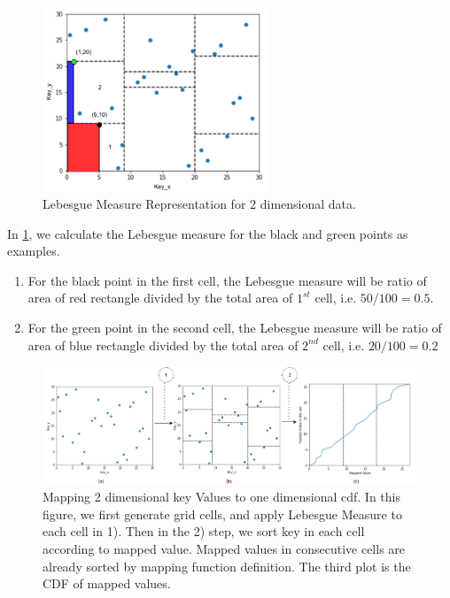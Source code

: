 \begin{figure}[t]
    \centering
    \includegraphics[width=0.6\textwidth]{graphs/implementation/Lebesgue_Measure.pdf}
    \caption{Lebesgue Measure Representation for 2 dimensional data.}
    \label{fig:Lebesgue_Measure}
\end{figure}

\begin{mscexample}
	In \ref{fig:Lebesgue_Measure}, we calculate the Lebesgue measure for the black and green points as examples.
	\begin{enumerate}
		\item For the black point in the first cell, the Lebesgue measure will be ratio of area of red rectangle divided by the total area of $1^{st}$ cell, i.e. $50/100=0.5$.
		\item For the green point in the second cell, the Lebesgue measure will be ratio of area of blue rectangle divided by the total area of $2^{nd}$ cell, i.e. $20/100= 0.2$ 
	\end{enumerate}
\end{mscexample}

\begin{figure}[t]
    \centering
    \includegraphics[width=1\textwidth]{graphs/Mapped_cdf.png}
    \caption{Mapping 2 dimensional key Values to one dimensional cdf. In this figure, we first generate grid cells, and apply Lebesgue Measure to each cell in 1). Then in the 2) step, we sort key in each cell according to mapped value. Mapped values in consecutive cells are already sorted by mapping function definition. The third plot is the CDF of mapped values.}
    \label{fig:Mapped_Cdf}
\end{figure}

